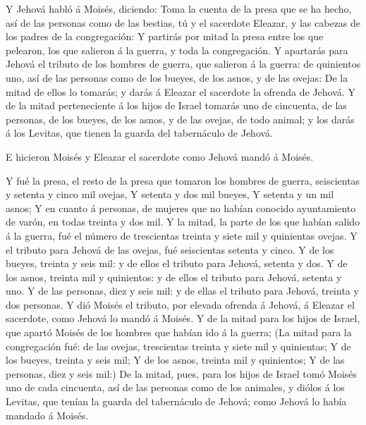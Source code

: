  Y Jehová habló á Moisés, diciendo:  Toma la
cuenta de la presa que se ha hecho, así de las personas como de las
bestias, tú y el sacerdote Eleazar, y las cabezas de los padres de la
congregación:  Y partirás por mitad la presa entre los que
pelearon, los que salieron á la guerra, y toda la congregación.
 Y apartarás para Jehová el tributo de los hombres de
guerra, que salieron á la guerra: de quinientos uno, así de las personas
como de los bueyes, de los asnos, y de las ovejas:  De la
mitad de ellos lo tomarás; y darás á Eleazar el sacerdote la ofrenda de
Jehová.  Y de la mitad perteneciente á los hijos de Israel
tomarás uno de cincuenta, de las personas, de los bueyes, de los asnos,
y de las ovejas, de todo animal; y los darás á los Levitas, que tienen
la guarda del tabernáculo de Jehová.

 E hicieron Moisés y Eleazar el sacerdote como Jehová mandó
á Moisés.

 Y fué la presa, el resto de la presa que tomaron los
hombres de guerra, seiscientas y setenta y cinco mil ovejas,
 Y setenta y dos mil bueyes,  Y setenta y un
mil asnos;  Y en cuanto á personas, de mujeres que no
habían conocido ayuntamiento de varón, en todas treinta y dos mil.
 Y la mitad, la parte de los que habían salido á la guerra,
fué el número de trescientas treinta y siete mil y quinientas ovejas.
 Y el tributo para Jehová de las ovejas, fué seiscientas
setenta y cinco.  Y de los bueyes, treinta y seis mil: y de
ellos el tributo para Jehová, setenta y dos.  Y de los
asnos, treinta mil y quinientos: y de ellos el tributo para Jehová,
setenta y uno.  Y de las personas, diez y seis mil: y de
ellas el tributo para Jehová, treinta y dos personas.  Y
dió Moisés el tributo, por elevada ofrenda á Jehová, á Eleazar el
sacerdote, como Jehová lo mandó á Moisés.  Y de la mitad
para los hijos de Israel, que apartó Moisés de los hombres que habían
ido á la guerra;  (La mitad para la congregación fué: de
las ovejas, trescientas treinta y siete mil y quinientas; 
Y de los bueyes, treinta y seis mil;  Y de los asnos,
treinta mil y quinientos;  Y de las personas, diez y seis
mil:)  De la mitad, pues, para los hijos de Israel tomó
Moisés uno de cada cincuenta, así de las personas como de los animales,
y diólos á los Levitas, que tenían la guarda del tabernáculo de Jehová;
como Jehová lo había mandado á Moisés.

